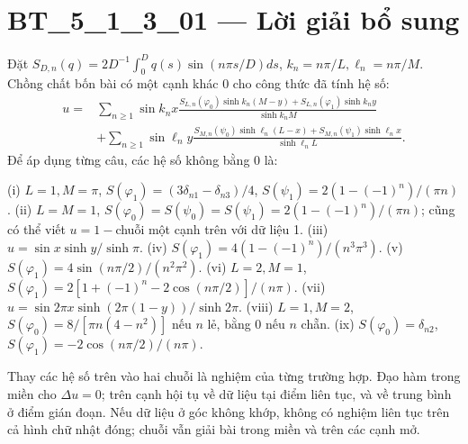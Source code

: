 \documentclass[10pt,a4paper]{article}
\begin{document}
\section*{BT\_5\_1\_3\_01 — Lời giải bổ sung}
Đặt $S_{D,n}(q)=2D^{-1}\int_0^Dq(s)\sin(n\pi s/D)ds$, $k_n=n\pi/L,\ell_n=n\pi/M$. Chồng chất bốn bài có một cạnh khác 0 cho công thức đã tính hệ số:
\begin{align*}
u={}&\sum_{n\ge1}\sin k_nx\frac{S_{L,n}(\varphi_0)\sinh k_n(M-y)+S_{L,n}(\varphi_1)\sinh k_ny}{\sinh k_nM}\\
&+\sum_{n\ge1}\sin\ell_ny\frac{S_{M,n}(\psi_0)\sinh\ell_n(L-x)+S_{M,n}(\psi_1)\sinh\ell_nx}{\sinh\ell_nL}.
\end{align*}
Để áp dụng từng câu, các hệ số không bằng 0 là:

(i) $L=1,M=\pi$, $S(\varphi_1)=(3\delta_{n1}-\delta_{n3})/4$, $S(\psi_1)=2(1-(-1)^n)/(\pi n)$.
(ii) $L=M=1$, $S(\varphi_0)=S(\psi_0)=S(\psi_1)=2(1-(-1)^n)/(\pi n)$; cũng có thể viết $u=1-$chuỗi một cạnh trên với dữ liệu 1.
(iii) $u=\sin x\sinh y/\sinh\pi$.
(iv) $S(\varphi_1)=4(1-(-1)^n)/(n^3\pi^3)$.
(v) $S(\varphi_1)=4\sin(n\pi/2)/(n^2\pi^2)$.
(vi) $L=2,M=1$, $S(\varphi_1)=2[1+(-1)^n-2\cos(n\pi/2)]/(n\pi)$.
(vii) $u=\sin2\pi x\sinh(2\pi(1-y))/\sinh2\pi$.
(viii) $L=1,M=2$, $S(\varphi_0)=8/[\pi n(4-n^2)]$ nếu $n$ lẻ, bằng 0 nếu $n$ chẵn.
(ix) $S(\varphi_0)=\delta_{n2}$, $S(\varphi_1)=-2\cos(n\pi/2)/(n\pi)$.

Thay các hệ số trên vào hai chuỗi là nghiệm của từng trường hợp. Đạo hàm trong miền cho $\Delta u=0$; trên cạnh hội tụ về dữ liệu tại điểm liên tục, và về trung bình ở điểm gián đoạn. Nếu dữ liệu ở góc không khớp, không có nghiệm liên tục trên cả hình chữ nhật đóng; chuỗi vẫn giải bài trong miền và trên các cạnh mở.
\end{document}
